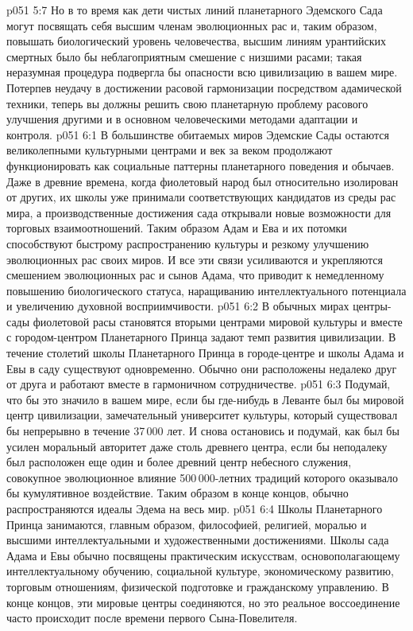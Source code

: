 \vs p051 5:7 Но в то время как дети чистых линий планетарного Эдемского Сада могут посвящать себя высшим членам эволюционных рас и, таким образом, повышать биологический уровень человечества, высшим линиям урантийских смертных было бы неблагоприятным смешение с низшими расами; такая неразумная процедура подвергла бы опасности всю цивилизацию в вашем мире. Потерпев неудачу в достижении расовой гармонизации посредством адамической техники, теперь вы должны решить свою планетарную проблему расового улучшения другими и в основном человеческими методами адаптации и контроля.
\vs p051 6:1 В большинстве обитаемых миров Эдемские Сады остаются великолепными культурными центрами и век за веком продолжают функционировать как социальные паттерны планетарного поведения и обычаев. Даже в древние времена, когда фиолетовый народ был относительно изолирован от других, их школы уже принимали соответствующих кандидатов из среды рас мира, а производственные достижения сада открывали новые возможности для торговых взаимоотношений. Таким образом Адам и Ева и их потомки способствуют быстрому распространению культуры и резкому улучшению эволюционных рас своих миров. И все эти связи усиливаются и укрепляются смешением эволюционных рас и сынов Адама, что приводит к немедленному повышению биологического статуса, наращиванию интеллектуального потенциала и увеличению духовной восприимчивости.
\vs p051 6:2 В обычных мирах центры\hyp{}сады фиолетовой расы становятся вторыми центрами мировой культуры и вместе с городом\hyp{}центром Планетарного Принца задают темп развития цивилизации. В течение столетий школы Планетарного Принца в городе\hyp{}центре и школы Адама и Евы в саду существуют одновременно. Обычно они расположены недалеко друг от друга и работают вместе в гармоничном сотрудничестве.
\vs p051 6:3 Подумай, что бы это значило в вашем мире, если бы где\hyp{}нибудь в Леванте был бы мировой центр цивилизации, замечательный университет культуры, который существовал бы непрерывно в течение 37\,000 лет. И снова остановись и подумай, как был бы усилен моральный авторитет даже столь древнего центра, если бы неподалеку был расположен еще один и более древний центр небесного служения, совокупное эволюционное влияние 500\,000\hyp{}летних традиций которого оказывало бы кумулятивное воздействие. Таким образом в конце концов, обычно распространяются идеалы Эдема на весь мир.
\vs p051 6:4 Школы Планетарного Принца занимаются, главным образом, философией, религией, моралью и высшими интеллектуальными и художественными достижениями. Школы сада Адама и Евы обычно посвящены практическим искусствам, основополагающему интеллектуальному обучению, социальной культуре, экономическому развитию, торговым отношениям, физической подготовке и гражданскому управлению. В конце концов, эти мировые центры соединяются, но это реальное воссоединение часто происходит после времени первого Сына\hyp{}Повелителя.
